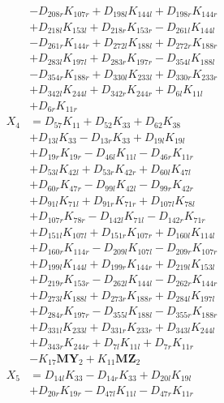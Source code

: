 \begin{multicols}{2}
\begin{align}
&- D_{208r}K_{107r} + D_{198l}K_{144l} + D_{198r}K_{144r}  \nonumber \\
&+ D_{218l}K_{153l} + D_{218r}K_{153r} - D_{261l}K_{144l}  \nonumber \\
&- D_{261r}K_{144r} + D_{272l}K_{188l} + D_{272r}K_{188r}  \nonumber \\
&+ D_{283l}K_{197l} + D_{283r}K_{197r} - D_{354l}K_{188l}  \nonumber \\
&- D_{354r}K_{188r} + D_{330l}K_{233l} + D_{330r}K_{233r}  \nonumber \\
&+ D_{342l}K_{244l} + D_{342r}K_{244r} + D_{6l}K_{11l}  \nonumber \\
&+ D_{6r}K_{11r} \nonumber \\
X_{4} &= D_{57}K_{11} + D_{52}K_{33} + D_{62}K_{38}  \nonumber \\
&+ D_{13l}K_{33} - D_{13r}K_{33} + D_{19l}K_{19l}  \nonumber \\
&+ D_{19r}K_{19r} - D_{46l}K_{11l} - D_{46r}K_{11r}  \nonumber \\
&+ D_{53l}K_{42l} + D_{53r}K_{42r} + D_{60l}K_{47l}  \nonumber \\
&+ D_{60r}K_{47r} - D_{99l}K_{42l} - D_{99r}K_{42r}  \nonumber \\
&+ D_{91l}K_{71l} + D_{91r}K_{71r} + D_{107l}K_{78l}  \nonumber \\
&+ D_{107r}K_{78r} - D_{142l}K_{71l} - D_{142r}K_{71r}  \nonumber \\
&+ D_{151l}K_{107l} + D_{151r}K_{107r} + D_{160l}K_{114l}  \nonumber \\
&+ D_{160r}K_{114r} - D_{209l}K_{107l} - D_{209r}K_{107r}  \nonumber \\
&+ D_{199l}K_{144l} + D_{199r}K_{144r} + D_{219l}K_{153l}  \nonumber \\
&+ D_{219r}K_{153r} - D_{262l}K_{144l} - D_{262r}K_{144r}  \nonumber \\
&+ D_{273l}K_{188l} + D_{273r}K_{188r} + D_{284l}K_{197l}  \nonumber \\
&+ D_{284r}K_{197r} - D_{355l}K_{188l} - D_{355r}K_{188r}  \nonumber \\
&+ D_{331l}K_{233l} + D_{331r}K_{233r} + D_{343l}K_{244l}  \nonumber \\
&+ D_{343r}K_{244r} + D_{7l}K_{11l} + D_{7r}K_{11r}  \nonumber \\
&- K_{17}\mathbf{MY}_2 + K_{11}\mathbf{MZ}_2 \nonumber \\
X_{5} &= D_{14l}K_{33} - D_{14r}K_{33} + D_{20l}K_{19l}  \nonumber \\
&+ D_{20r}K_{19r} - D_{47l}K_{11l} - D_{47r}K_{11r}  \nonumber \\

\end{align}
\end{multicols}
